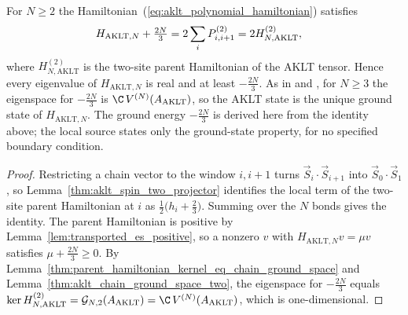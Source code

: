 \begin{lemma}%
    \label{thm:aklt_polynomial_ground_state}
    \leanok
    For $N\ge2$ the Hamiltonian~(\ref{eq:aklt_polynomial_hamiltonian})
    satisfies
    \begin{align}
        H_{\mathrm{AKLT},N}+\tfrac{2N}{3}
         & =2\sum_iP^{(2)}_{i,i+1}=2H^{(2)}_{N,\mathrm{AKLT}},
        \notag
    \end{align}
    where $H^{(2)}_{N,\mathrm{AKLT}}$ is the two-site parent Hamiltonian of the
    AKLT tensor. Hence every eigenvalue of $H_{\mathrm{AKLT},N}$ is real and at
    least $-\tfrac{2N}{3}$. As in \cite{AKLT1987Rigorous} and
    \cite[local TeX lines~340--349]{PerezGarcia2007Matrix}, for $N\ge3$ the
    eigenspace for $-\tfrac{2N}{3}$ is $\C\,V^{(N)}(A_{\mathrm{AKLT}})$, so
    the AKLT state is the unique ground state of $H_{\mathrm{AKLT},N}$.
    The ground energy $-\tfrac{2N}{3}$ is derived here from the identity above;
    the local source states only the ground-state property, for no specified
    boundary condition.
\end{lemma}

\begin{proof}
    \leanok
    Restricting a chain vector to the window $i,i+1$ turns
    $\vec S_i\cdot\vec S_{i+1}$ into $\vec S_0\cdot\vec S_1$, so
    Lemma~\ref{thm:aklt_spin_two_projector} identifies the local term of the
    two-site parent Hamiltonian at $i$ as $\tfrac12\bigl(h_i+\tfrac23\bigr)$.
    Summing over the $N$ bonds gives the identity. The parent Hamiltonian is
    positive by Lemma~\ref{lem:transported_es_positive}, so a nonzero $v$ with
    $H_{\mathrm{AKLT},N}v=\mu v$ satisfies $\mu+\tfrac{2N}{3}\ge0$. By
    Lemma~\ref{thm:parent_hamiltonian_kernel_eq_chain_ground_space} and
    Lemma~\ref{thm:aklt_chain_ground_space_two}, the eigenspace for
    $-\tfrac{2N}{3}$ equals
    $\ker H^{(2)}_{N,\mathrm{AKLT}}=\mathcal G_{N,2}(A_{\mathrm{AKLT}})
        =\C\,V^{(N)}(A_{\mathrm{AKLT}})$, which is one-dimensional.
\end{proof}

